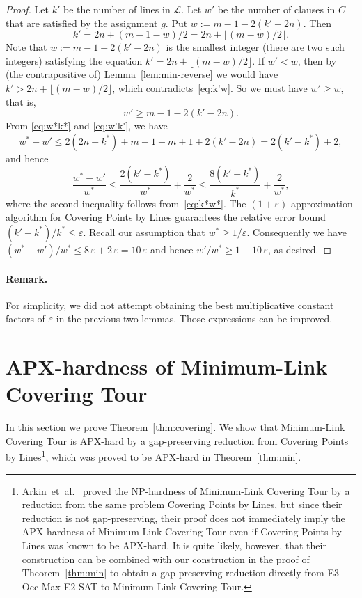 \documentclass[letterpaper,11pt]{article}
\def\etal{{et~al.}}
\def\L{{\mathcal L}}
\newcommand{\eps}{\varepsilon}
\begin{document}
\begin{proof}
Let $k'$ be the number of lines in $\L$.
Let $w'$ be the number of clauses in $C$ that are satisfied by the
assignment $g$.
Put $w := m - 1 - 2(k' - 2n)$.
Then
\begin{equation}\label{eq:k'w}
k' =  2n + (m-1-w)/2 = 2n + \lfloor (m-w)/2 \rfloor.
\end{equation}
Note that
$w := m - 1 - 2(k' - 2n)$ is the smallest integer (there are two such integers)
satisfying the equation
$k' =  2n + \lfloor (m-w)/2 \rfloor$.
If $w' < w$, then by (the contrapositive of) Lemma~\ref{lem:min-reverse}
we would have
$k' > 2n + \lfloor (m-w)/2 \rfloor$,
which contradicts~\eqref{eq:k'w}.
So we must have $w' \ge w$, that is,
\begin{equation}\label{eq:w'k'}
w' \ge m - 1 - 2(k' - 2n).
\end{equation}
From \eqref{eq:w*k*} and \eqref{eq:w'k'}, we have
$$
w^* - w'
\le 2(2n - k^*) + m + 1 - m + 1 + 2(k' - 2n)
= 2(k' - k^*) + 2,
$$
and hence
$$
\frac{w^* - w'}{w^*}
\le \frac{2(k' - k^*)}{w^*} + \frac2{w^*}
\le \frac{8(k' - k^*)}{k^*} + \frac2{w^*},
$$
where the second inequality follows from~\eqref{eq:k*w*}.
The $(1+\eps)$-approximation algorithm for {\sc Covering Points by Lines}
guarantees the relative error bound
$(k' - k^*)/k^* \le \eps$.
Recall our assumption that
$w^* \ge 1/\eps$.
Consequently we have
$(w^* - w')/w^* \le 8\,\eps + 2\,\eps = 10\,\eps$
and hence $w'/w^* \ge 1 - 10\,\eps$, as desired.
\end{proof}

\paragraph{Remark.} For simplicity, we did not attempt obtaining
the best multiplicative constant factors of $\eps$ in the previous two
lemmas. Those expressions can be improved. 


\section{APX-hardness of {\sc Minimum-Link Covering Tour}}

In this section we prove Theorem~\ref{thm:covering}.
We show that {\sc Minimum-Link Covering Tour} is APX-hard
by a gap-preserving reduction from {\sc Covering Points by Lines}\footnote{Arkin~\etal~\cite{AMP03} proved the NP-hardness of
{\sc Minimum-Link Covering Tour} by a reduction from the same problem
{\sc Covering Points by Lines}, 
but since their reduction is not gap-preserving,
their proof does not immediately imply the APX-hardness of
{\sc Minimum-Link Covering Tour} even if {\sc Covering Points by
  Lines} was known to be APX-hard. 
It is quite likely, however, that their construction can be combined with
our construction in the proof of Theorem~\ref{thm:min}
to obtain a gap-preserving reduction
directly from {\sc E$3$-Occ-Max-E$2$-SAT} to {\sc Minimum-Link Covering Tour}.},
which was proved to be APX-hard in Theorem~\ref{thm:min}.
\end{document}

